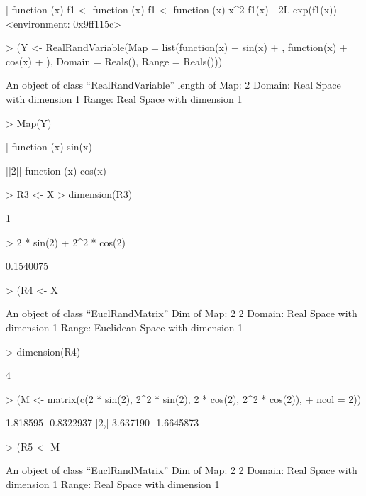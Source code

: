 \documentclass[11pt]{article}
\begin{document}
\begin{Schunk}
\begin{Soutput}
[[2]]
function (x) 
{
    f1 <- function (x) 
    {
        f1 <- function (x) 
        {
            x^2
        }
        f1(x) - 2L
    }
    exp(f1(x))
}
<environment: 0x9ff115c>
\end{Soutput}
\begin{Sinput}
> (Y <- RealRandVariable(Map = list(function(x) {
+     sin(x)
+ }, function(x) {
+     cos(x)
+ }), Domain = Reals(), Range = Reals()))
\end{Sinput}
\begin{Soutput}
An object of class “RealRandVariable” 
length of Map:	 2 
Domain:	Real Space with dimension 1 
Range:	Real Space with dimension 1 
\end{Soutput}
\begin{Sinput}
> Map(Y)
\end{Sinput}
\begin{Soutput}
[[1]]
function (x) 
{
    sin(x)
}

[[2]]
function (x) 
{
    cos(x)
}
\end{Soutput}
\begin{Sinput}
> R3 <- X %
> dimension(R3)
\end{Sinput}
\begin{Soutput}
[1] 1
\end{Soutput}
\begin{Sinput}
> 2 * sin(2) + 2^2 * cos(2)
\end{Sinput}
\begin{Soutput}
[1] 0.1540075
\end{Soutput}
\begin{Sinput}
> (R4 <- X %
\end{Sinput}
\begin{Soutput}
An object of class “EuclRandMatrix” 
Dim of Map:	 2 2 
Domain:	Real Space with dimension 1 
Range:	Euclidean Space with dimension 1 
\end{Soutput}
\begin{Sinput}
> dimension(R4)
\end{Sinput}
\begin{Soutput}
[1] 4
\end{Soutput}
\begin{Sinput}
> (M <- matrix(c(2 * sin(2), 2^2 * sin(2), 2 * cos(2), 2^2 * cos(2)), 
+     ncol = 2))
\end{Sinput}
\begin{Soutput}
         [,1]       [,2]
[1,] 1.818595 -0.8322937
[2,] 3.637190 -1.6645873
\end{Soutput}
\begin{Sinput}
> (R5 <- M %
\end{Sinput}
\begin{Soutput}
An object of class “EuclRandMatrix” 
Dim of Map:	 2 2 
Domain:	Real Space with dimension 1 
Range:	Real Space with dimension 1 
\end{Soutput}
\end{Schunk}
\end{document}
